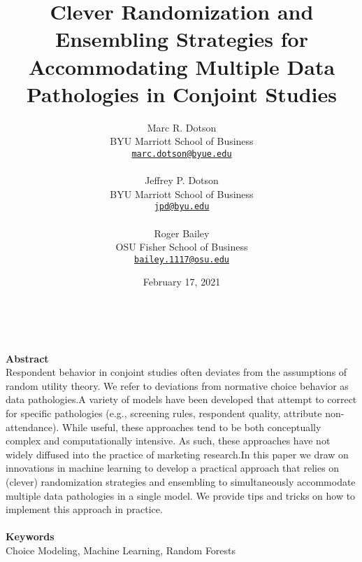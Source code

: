 \documentclass[12pt,titlepage]{mktg-article}
\begin{document}
\title{Clever Randomization and Ensembling Strategies for Accommodating Multiple Data Pathologies in Conjoint Studies}
\author{
    Marc R. Dotson\\
  BYU Marriott School of Business\\
  \href{mailto:marc.dotson@byue.edu}{\nolinkurl{marc.dotson@byue.edu}}\\
   \\   Jeffrey P. Dotson\\
  BYU Marriott School of Business\\
  \href{mailto:jpd@byu.edu}{\nolinkurl{jpd@byu.edu}}\\
   \\   Roger Bailey\\
  OSU Fisher School of Business\\
  \href{mailto:bailey.1117@osu.edu}{\nolinkurl{bailey.1117@osu.edu}}\\
  }
\date{February 17, 2021}

\maketitle
\doublespacing

\begin{center}
{}\\
\end{center}
\vspace{4mm}
\textbf{Abstract}\\
Respondent behavior in conjoint studies often deviates from the assumptions of random utility theory. We refer to deviations from normative choice behavior as data pathologies.A variety of models have been developed that attempt to correct for specific pathologies (e.g., screening rules, respondent quality, attribute non-attendance). While useful, these approaches tend to be both conceptually complex and computationally intensive. As such, these approaches have not widely diffused into the practice of marketing research.In this paper we draw on innovations in machine learning to develop a practical approach that relies on (clever) randomization strategies and ensembling to simultaneously accommodate multiple data pathologies in a single model. We provide tips and tricks on how to implement this approach in practice.
\\ \\
\noindent \textbf{Keywords}\\ 
Choice Modeling, Machine Learning, Random Forests
\end{document}
